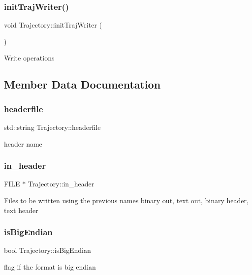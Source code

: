 \subsubsection{\texorpdfstring{init\+Traj\+Writer()}{initTrajWriter()}}
{\footnotesize\ttfamily void Trajectory\+::init\+Traj\+Writer (\begin{DoxyParamCaption}{ }\end{DoxyParamCaption})}

Write operations 

\subsection{Member Data Documentation}
\mbox{\label{class_trajectory_a6bb5d5e4ad4fb36a65d6cffdc6ab05af}} 
\subsubsection{\texorpdfstring{headerfile}{headerfile}}
{\footnotesize\ttfamily std\+::string Trajectory\+::headerfile}

header name \mbox{\label{class_trajectory_a6a7484c5282331583841b038997d597b}} 
\subsubsection{\texorpdfstring{in\+\_\+header}{in\_header}}
{\footnotesize\ttfamily F\+I\+LE $\ast$ Trajectory\+::in\+\_\+header}

Files to be written using the previous names binary out, text out, binary header, text header \mbox{\label{class_trajectory_a66dfa9e8d1e60706b8e8bb1e91a34e29}} 
\subsubsection{\texorpdfstring{is\+Big\+Endian}{isBigEndian}}
{\footnotesize\ttfamily bool Trajectory\+::is\+Big\+Endian}

flag if the format is big endian \mbox{\label{class_trajectory_a4b6369fb83108e27a774f50c06169817}} 
